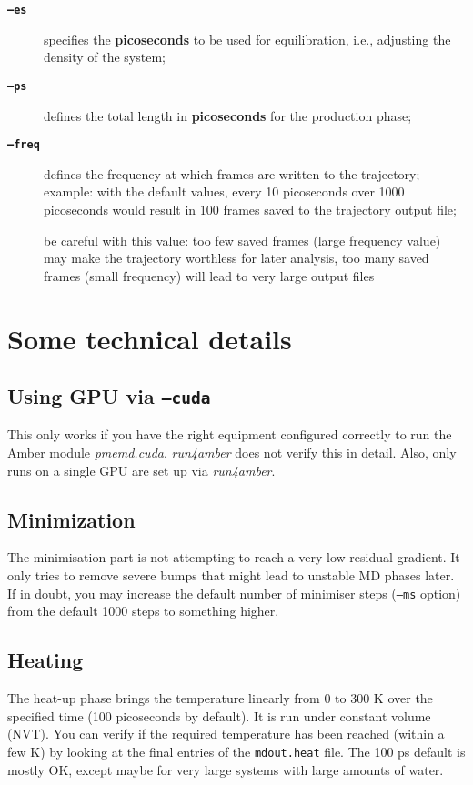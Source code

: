 \documentclass[10pt,landscape,twocolumn]{article}
\begin{document}
\begin{description}
\item[\textbf{\texttt{--es}}] specifies the \textbf{picoseconds} to be used for equilibration, i.e., adjusting the density of the system;

\item[\textbf{\texttt{--ps}}] defines the total length in \textbf{picoseconds} for the production phase;

\item[\textbf{\texttt{--freq}}] defines the frequency at which frames are written to the trajectory; example: with the default values, every 10 picoseconds over 1000 picoseconds would result in 100 frames saved to the trajectory output file; \begin{mdframed}be careful with this value: too few saved frames (large frequency value) may make the trajectory worthless for later analysis, too many saved frames (small frequency) will lead to very large output files\end{mdframed}
\end{description}


\section{Some technical details}

\subsection{Using GPU via \texttt{--cuda}}
This only works if you have the right equipment configured correctly to run the Amber module \textsl{pmemd.cuda}. \textsl{run4amber} does not verify this in detail. Also, only runs on a single GPU are set up via \textsl{run4amber}.

\subsection{Minimization}
The minimisation part is not attempting to reach a very low residual gradient. It only tries to remove severe bumps that might lead to unstable MD phases later. If in doubt, you may increase the default number of minimiser steps (\texttt{--ms} option) from the default 1000 steps to something higher.

\subsection{Heating}
The heat-up phase brings the temperature linearly from 0 to 300 K over the specified time (100 picoseconds by default). It is run under constant volume (NVT). You can verify if the required temperature has been reached (within a few K) by looking at the final entries of the \texttt{mdout.heat} file. The 100 ps default is mostly OK, except maybe for very large systems with large amounts of water.
\end{document}
